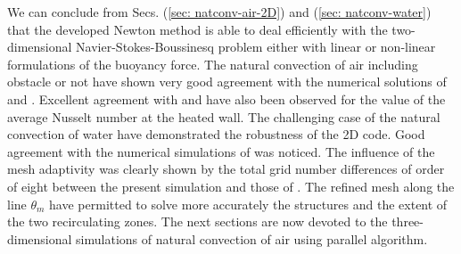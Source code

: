 We can conclude from Secs. (\ref{sec: natconv-air-2D}) and (\ref{sec: natconv-water}) that the developed Newton method is able to deal  efficiently with the two-dimensional Navier-Stokes-Boussinesq problem either with linear or non-linear formulations of the buoyancy force.
The natural convection of air including obstacle or not have shown very good agreement with the numerical solutions of \cite{LeQuere91} and \cite{Raluca2013}.
Excellent agreement with \cite{de1983natural} and \cite{LeQuere91} have also been observed for the value of the average Nusselt number at the heated wall. 
The challenging case of the natural convection of water have demonstrated the robustness of the 2D code. 
Good agreement with the numerical simulations of \cite{Kowalewski-2003} was noticed. 
The influence of the mesh adaptivity was clearly shown by the total grid number differences of order of eight between the present simulation and those of \cite{Kowalewski-2003} .
The refined mesh along the line $\theta_m$ have permitted to solve more accurately the structures and the extent of the two recirculating zones.
The next sections are now devoted to the three-dimensional simulations of natural convection of air using parallel algorithm.
%
%
%
% 
